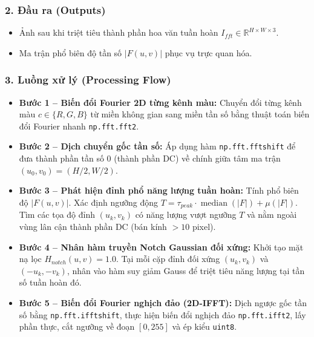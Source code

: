 \subsubsection*{2. Đầu ra (Outputs)}
\begin{itemize}
    \item Ảnh sau khi triệt tiêu thành phần hoa văn tuần hoàn $I_{fft} \in \mathbb{R}^{H \times W \times 3}$.
    \item Ma trận phổ biên độ tần số $|F(u, v)|$ phục vụ trực quan hóa.
\end{itemize}

\subsubsection*{3. Luồng xử lý (Processing Flow)}
\begin{itemize}
    \item \textbf{Bước 1 -- Biến đổi Fourier 2D từng kênh màu:} Chuyển đổi từng kênh màu $c \in \{R, G, B\}$ từ miền không gian sang miền tần số bằng thuật toán biến đổi Fourier nhanh \texttt{np.fft.fft2}.
    \item \textbf{Bước 2 -- Dịch chuyển gốc tần số:} Áp dụng hàm \texttt{np.fft.fftshift} để đưa thành phần tần số 0 (thành phần DC) về chính giữa tâm ma trận $(u_0, v_0) = (H/2, W/2)$.
    \item \textbf{Bước 3 -- Phát hiện đỉnh phổ năng lượng tuần hoàn:} Tính phổ biên độ $|F(u, v)|$. Xác định ngưỡng động $T = \tau_{peak} \cdot \operatorname{median}(|F|) + \mu(|F|)$. Tìm các tọa độ đỉnh $(u_k, v_k)$ có năng lượng vượt ngưỡng $T$ và nằm ngoài vùng lân cận thành phần DC (bán kính $> 10$ pixel).
    \item \textbf{Bước 4 -- Nhân hàm truyền Notch Gaussian đối xứng:} Khởi tạo mặt nạ lọc $H_{notch}(u, v) = 1.0$. Tại mỗi cặp đỉnh đối xứng $(u_k, v_k)$ và $(-u_k, -v_k)$, nhân vào hàm suy giảm Gauss để triệt tiêu năng lượng tại tần số tuần hoàn đó.
    \item \textbf{Bước 5 -- Biến đổi Fourier nghịch đảo (2D-IFFT):} Dịch ngược gốc tần số bằng \texttt{np.fft.ifftshift}, thực hiện biến đổi nghịch đảo \texttt{np.fft.ifft2}, lấy phần thực, cắt ngưỡng về đoạn $[0, 255]$ và ép kiểu \texttt{uint8}.
\end{itemize}

